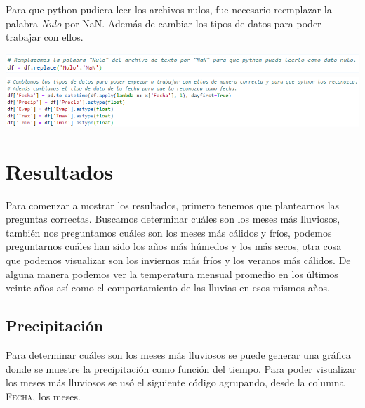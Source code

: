 \documentclass{article}
\begin{document}
Para que python pudiera leer los archivos nulos, fue necesario reemplazar la palabra \textit{Nulo} por NaN. Además de cambiar los tipos de datos para poder trabajar con ellos.
\begin{center}
    \includegraphics[scale = .74]{NaN.png}
    \includegraphics[scale = 0.65]{Float.png}
\end{center}

\section{Resultados}
Para comenzar a mostrar los resultados, primero tenemos que plantearnos las preguntas correctas. Buscamos determinar cuáles son los meses más lluviosos, también nos preguntamos cuáles son los meses más cálidos y fríos, podemos preguntarnos cuáles han sido los años más húmedos y los más secos, otra cosa que podemos visualizar son los inviernos más fríos y los veranos más cálidos. De alguna manera podemos ver la temperatura mensual promedio en los últimos veinte años así como el comportamiento de las lluvias en esos mismos años.

\subsection{Precipitación}
Para determinar cuáles son los meses más lluviosos se puede generar una gráfica donde se muestre la precipitación como función del tiempo. Para poder visualizar los meses más lluviosos se usó el siguiente código agrupando, desde la columna \textsc{Fecha}, los meses.
\end{document}
